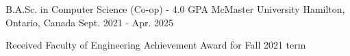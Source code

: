 

\begin{cventries}

  \cventry
    {B.A.Sc. in Computer Science (Co-op) - 4.0 GPA} %
    {McMaster University} %
    {Hamilton, Ontario, Canada} %
    {Sept. 2021 - Apr. 2025} %
    {
    \begin{cvitems}
      \item {Received Faculty of Engineering Achievement Award for Fall 2021 term}
    \end{cvitems}
    }

\end{cventries}
